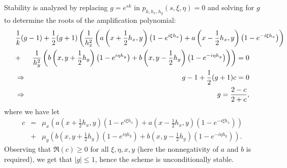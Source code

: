 \documentclass{article}
\begin{document}
\begin{enumerate}
\begin{enumerate}
Stability is analyzed by replacing \(g = e^{sk}\) in \(p_{k,h_x,h_y}(s,\xi,\eta) = 0\) and solving for \(g\) to determine the roots of the amplification polynomial:
\begin{eqnarray*}
\lefteqn{\frac{1}{k}(g - 1) + \frac{1}{2}(g + 1) \left( \frac{1}{h_x^2} \left( a \left( x + \frac{1}{2} h_x, y \right) \left( 1 - e^{i\xi h_x} \right) + a \left( x - \frac{1}{2} h_x, y \right) \left( 1 - e^{-i\xi h_x} \right) \right) \right.} \\
& + & \left. \frac{1}{h_y^2} \left( b \left( x, y + \frac{1}{2} h_y \right) \left( 1 - e^{i\eta h_y} \right) + b \left( x, y - \frac{1}{2} h_y \right) \left( 1 - e^{-i\eta h_y} \right) \right) \right) = 0 \\
& \Rightarrow & g - 1 + \frac{1}{2} (g + 1) c = 0 \\
& \Rightarrow & g = \frac{2 - c}{2 + c},
\end{eqnarray*}
where we have let
\begin{eqnarray*}
c & = & \mu_x \left( a \left( x + \frac{1}{2} h_x, y \right) \left( 1 - e^{i\xi h_x} \right) + a \left( x - \frac{1}{2} h_x, y \right) \left( 1 - e^{-i\xi h_x} \right) \right) \\
  & + & \mu_y \left( b \left( x, y + \frac{1}{2} h_y \right) \left( 1 - e^{i\eta h_y} \right) + b \left( x, y - \frac{1}{2} h_y \right) \left( 1 - e^{-i\eta h_y} \right) \right).
\end{eqnarray*}
Observing that \(\Re(c) \geq 0\) for all \(\xi,\eta,x,y\) (here the nonnegativity of \(a\) and \(b\) is required), we get that \(|g| \leq 1\), hence the scheme is unconditionally stable.


\end{enumerate}
\end{enumerate}
\end{document}
